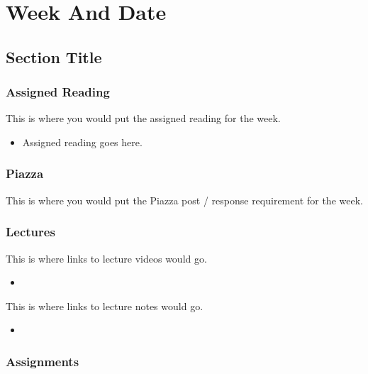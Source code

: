 \clearpage

\newcommand{\ChapTitle}{Week And Date}
\newcommand{\SectionTitle}{Section Title}

\chapter{\ChapTitle}

\section{\SectionTitle}

\subsection{Assigned Reading}

This is where you would put the assigned reading for the week.

\begin{itemize}
    \item Assigned reading goes here.
\end{itemize}

\subsection{Piazza}

This is where you would put the Piazza post / response requirement for the week.

\subsection{Lectures}

This is where links to lecture videos would go.

\begin{itemize}
    \item {}
\end{itemize}

\noindent This is where links to lecture notes would go.

\begin{itemize}
    \item {}
\end{itemize}

\subsection{Assignments}


